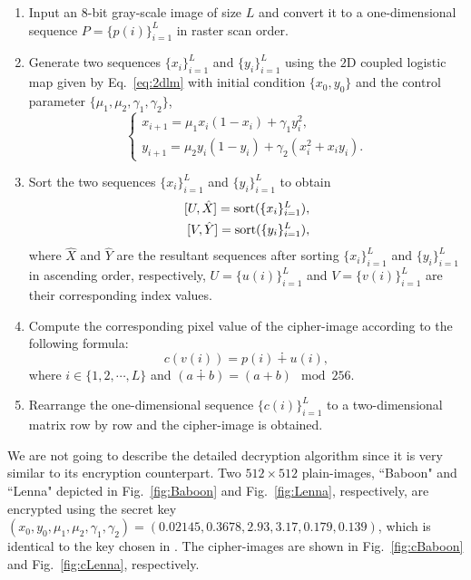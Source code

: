 \documentclass[smallextended, final]{svjour3}          \smartqed
\newcommand\sort{{\rm sort}}
\begin{document}
\begin{enumerate}\item Input an $8$-bit gray-scale image of size $L$ and convert it to a
one-dimensional sequence $P=\{p(i)\}_{i=1}^{L}$ in raster scan order.

\item Generate two sequences $\{x_i\}_{i=1}^{L}$ and $\{y_i\}_{i=1}^{L}$
using the $2$D coupled logistic map given by Eq.~\eqref{eq:2dlm}
with initial condition $\{x_0, y_0\}$ and the control parameter
$\{\mu_1, \mu_2, \gamma_1, \gamma_2\}$,
\begin{equation}
\label{eq:2dlm}
\begin{cases}
x_{i+1} = \mu_1x_i(1-x_i)+\gamma_1y_i^2,\\
y_{i+1} = \mu_2y_i(1-y_i)+\gamma_2(x_i^2+x_iy_i).
\end{cases}
\end{equation}

\item Sort the two sequences $\{x_i\}_{i=1}^{L}$ and $\{y_i\}_{i=1}^{L}$
to obtain
\begin{equation}
\nonumber
\begin{split}
[U, \hat{X}] = \sort(\{x_i\}_{i=1}^{L}),\\
[V, \hat{Y}] = \sort(\{y_i\}_{i=1}^{L}),
\end{split}
\end{equation}
where $\hat{X}$ and $\hat{Y}$ are the resultant sequences after
sorting $\{x_i\}_{i=1}^{L}$ and $\{y_i\}_{i=1}^{L}$ in ascending order, respectively,
$U=\{u(i)\}_{i=1}^{L}$ and $V=\{v(i)\}_{i=1}^{L}$ are their corresponding index values.

\item Compute the corresponding pixel value of the cipher-image according to the following formula:
\begin{equation}
\label{eq:encrypt}
c(v(i)) = p(i)\dotplus u(i),
\end{equation}
where $i \in \{1, 2, \cdots, L\}$ and $(a \dotplus b) = (a+b)\mod{256}$.

\item Rearrange the one-dimensional sequence $\{c(i)\}_{i=1}^{L}$ to a two-dimensional matrix
row by row and the cipher-image is obtained.
\end{enumerate}

We are not going to describe the detailed decryption algorithm since it is very similar to its encryption counterpart.
Two $512 \times 512$ plain-images, ``Baboon" and ``Lenna" depicted in Fig.~\ref{fig:Baboon} and Fig.~\ref{fig:Lenna}, respectively,  are encrypted
using the secret key $(x_0, y_0, \mu_1, \mu_2, \gamma_1, \gamma_2) = (0.02145, 0.3678, 2.93, 3.17, 0.179, 0.139)$,
which is identical to the key chosen in \cite[Sec.~4.1]{li2012image}.
The cipher-images are shown in Fig.~\ref{fig:cBaboon} and Fig.~\ref{fig:cLenna}, respectively.
\end{document}
